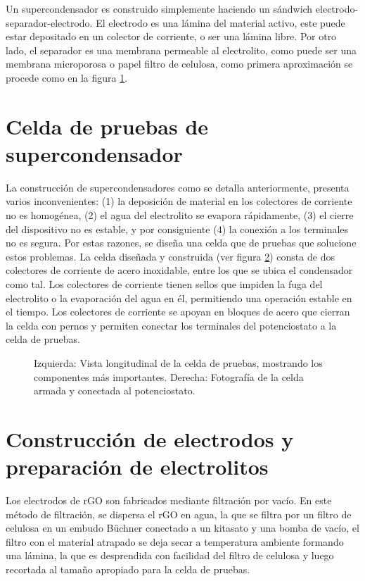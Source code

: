 Un supercondensador es construido simplemente haciendo un sándwich electrodo-separador-electrodo. El electrodo es una lámina del material activo, este puede estar depositado en un colector de corriente, o ser una lámina libre. Por otro lado, el separador es una membrana permeable al electrolito, como puede ser una membrana microporosa o papel filtro de celulosa, como primera aproximación se procede como en la figura \ref{fig:SC_process}.

\begin{figure}[h!]
	\centering
	\caption{}
	\label{fig:SC_process}
\end{figure}

\section{Celda de pruebas de supercondensador}
La construcción de supercondensadores como se detalla anteriormente, presenta varios inconvenientes: (1) la deposición de material en los colectores de corriente no es homogénea, (2) el agua del electrolito se evapora rápidamente, (3) el cierre del dispositivo no es estable, y por consiguiente (4) la conexión a los terminales no es segura. Por estas razones, se diseña una celda que de pruebas que solucione estos problemas.
La celda diseñada y construida (ver figura \ref{fig:celda_de_pruebas_SC}) consta de dos colectores de corriente de acero inoxidable, entre los que se ubica el condensador como tal. Los colectores de corriente tienen sellos que impiden la fuga del electrolito o la evaporación del agua en él, permitiendo una operación estable en el tiempo. Los colectores de corriente se apoyan en bloques de acero que cierran la celda con pernos y permiten conectar los terminales del potenciostato a la celda de pruebas.

\begin{figure}[h!]
	\centering
	\caption{Izquierda: Vista longitudinal de la celda de pruebas, mostrando los componentes más importantes. Derecha: Fotografía de la celda armada y conectada al potenciostato.}
	\label{fig:celda_de_pruebas_SC}
\end{figure}

\section{Construcción de electrodos y preparación de electrolitos}
Los electrodos de rGO son fabricados mediante filtración por vacío. En este método de filtración, se dispersa el rGO en agua, la que se filtra por un filtro de celulosa en un embudo Büchner conectado a un kitasato y una bomba de vacío, el filtro con el material atrapado se deja secar a temperatura ambiente formando una lámina, la que es desprendida con facilidad del filtro de celulosa y luego recortada al tamaño apropiado para la celda de pruebas.

